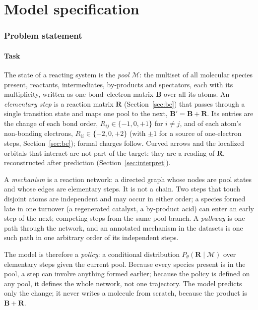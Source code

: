 \documentclass[11pt,a4paper]{article}
\newcommand{\vb}[1]{\bm{#1}}
\newcommand{\set}[1]{\{#1\}}
\begin{document}
\part{Model specification}

\section{Problem statement}

\subsection{Task}
The state of a reacting system is the \emph{pool} $\mathcal{M}$: the multiset of all molecular species present, reactants, intermediates, by-products and spectators, each with its multiplicity, written as one bond--electron matrix $\vb{B}$ over all its atoms. An \emph{elementary step} is a reaction matrix $\vb{R}$ (Section~\ref{sec:be}) that passes through a single transition state and maps one pool to the next, $\vb{B}'=\vb{B}+\vb{R}$. Its entries are the change of each bond order, $R_{ij}\in\set{-1,0,+1}$ for $i\ne j$, and of each atom's non-bonding electrons, $R_{ii}\in\set{-2,0,+2}$ (with $\pm1$ for a source of one-electron steps, Section~\ref{sec:be}); formal charges follow. Curved arrows and the localized orbitals that interact are not part of the target: they are a reading of $\vb{R}$, reconstructed after prediction (Section~\ref{sec:interpret}).

A \emph{mechanism} is a reaction network: a directed graph whose nodes are pool states and whose edges are elementary steps. It is not a chain. Two steps that touch disjoint atoms are independent and may occur in either order; a species formed late in one turnover (a regenerated catalyst, a by-product acid) can enter an early step of the next; competing steps from the same pool branch. A \emph{pathway} is one path through the network, and an annotated mechanism in the datasets is one such path in one arbitrary order of its independent steps.

The model is therefore a \emph{policy}: a conditional distribution $P_\theta(\vb{R}\mid\mathcal{M})$ over elementary steps given the current pool. Because every species present is in the pool, a step can involve anything formed earlier; because the policy is defined on any pool, it defines the whole network, not one trajectory. The model predicts only the change; it never writes a molecule from scratch, because the product is $\vb{B}+\vb{R}$.
\end{document}
